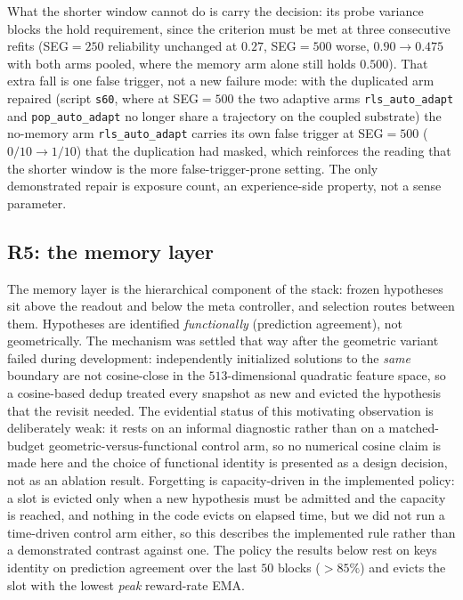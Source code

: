 \documentclass[preprint,12pt]{elsarticle}
\begin{document}
What the shorter window cannot do is carry
the decision: its probe variance blocks the hold requirement, since the
criterion must be met at three consecutive refits (SEG$=250$ reliability
unchanged at $0.27$, SEG$=500$ worse, $0.90\to0.475$ with both arms pooled,
where the memory arm alone still holds $0.500$). That extra fall is one false
trigger, not a new failure mode: with the duplicated arm repaired (script
\texttt{s60}, where at SEG$=500$ the two adaptive arms \texttt{rls\_auto\_adapt} and \texttt{pop\_auto\_adapt} no longer share a trajectory on the coupled substrate) the
no-memory arm \texttt{rls\_auto\_adapt} carries its own false trigger at
SEG$=500$ ($0/10\to1/10$) that the duplication had masked, which reinforces
the reading that the shorter window is the more false-trigger-prone setting.
The only
demonstrated repair is exposure count, an experience-side property, not
a sense parameter.

\subsection{R5: the memory layer}
\label{sec:r5}

The memory layer is the hierarchical component of the stack: frozen
hypotheses sit above the readout and below the meta controller, and
selection routes between them. Hypotheses are identified \emph{functionally} (prediction agreement), not
geometrically. The mechanism was settled that way after the geometric variant
failed during development: independently initialized solutions to the
\emph{same} boundary are not cosine-close in the $513$-dimensional quadratic
feature space, so a cosine-based dedup treated every snapshot as new and
evicted the hypothesis that the revisit needed. The evidential status of this
motivating observation is deliberately weak: it rests on an informal
diagnostic rather than on a matched-budget geometric-versus-functional
control arm, so no numerical cosine claim is made here and the choice of
functional identity is presented as a design decision, not as an ablation
result. Forgetting is capacity-driven in the
implemented policy: a slot is evicted only when a new hypothesis must be
admitted and the capacity is reached, and nothing in the code evicts on
elapsed time, but we did not run a time-driven control arm either, so this
describes the implemented rule rather than a demonstrated contrast against
one. The policy the results below rest on keys identity on prediction
agreement over the last $50$ blocks ($>85\%$) and evicts the slot with the
lowest \emph{peak} reward-rate EMA.
\end{document}
